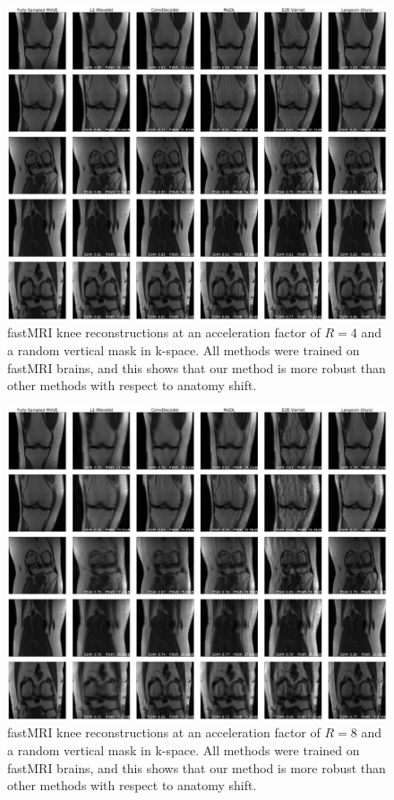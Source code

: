 \documentclass{article}
\begin{document}
\begin{figure}
    \centering
    \includegraphics[width=\columnwidth]{knee-random-vertical-R=4-comp.pdf}
    \caption{fastMRI knee reconstructions at an acceleration factor of $R=4$ and a random vertical mask in k-space. All methods were trained on fastMRI brains, and this shows that our method is more robust than other methods with respect to anatomy shift. 
    }
    \label{fig:knee-random-vertical-4}
\end{figure}

\begin{figure}
    \centering
    \includegraphics[width=\columnwidth]{knee-random-vertical-R=8-comp.pdf}
    \caption{fastMRI knee reconstructions at an acceleration factor of $R=8$ and a random vertical mask in k-space. All methods were trained on fastMRI brains, and this shows that our method is more robust than other methods with respect to anatomy shift.
    }
    \label{fig:knee-random-vertical-8}
\end{figure}
\end{document}
